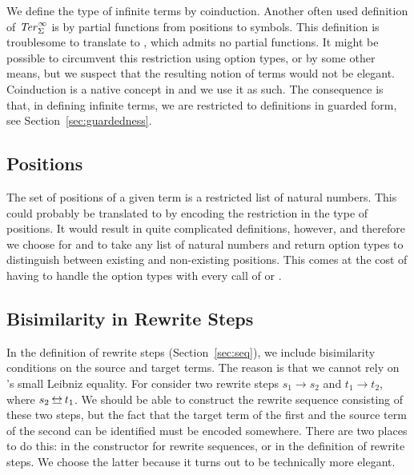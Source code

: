 We define the type of infinite terms by coinduction. Another often
used definition of $\mathit{Ter}_\Sigma^\infty$ is by partial functions from positions to
symbols. This definition is troublesome to translate to \Coq, which
admits no partial functions. It might be possible to circumvent this
restriction using option types, or by some other means, but we suspect
that the resulting notion of terms would not be elegant. Coinduction
is a native concept in \Coq and we use it as such. The consequence is that, in
defining infinite terms, we are restricted to definitions in guarded form, see
Section~\ref{sec:guardedness}.


\subsection{Positions}

The set of positions of a given term is a restricted list of natural
numbers. This could probably be translated to \Coq by encoding the
restriction in the type of positions. It would result in quite
complicated definitions, however, and therefore we choose for
 and
 to take any list of
natural numbers and return option types to distinguish between
existing and non-existing positions. This comes at the cost of having
to handle the option types with every call of
 or
.


\subsection{Bisimilarity in Rewrite Steps}\label{sub:bissteps}

In the definition of rewrite steps (Section~\ref{sec:seq}), we include
bisimilarity conditions on the source and target terms. The reason is
that we cannot rely on \Coq's small Leibniz equality. For consider two
rewrite steps $s_1 \to s_2$ and $t_1 \to t_2$, where $s_2 \bis
t_1$. We should be able to construct the rewrite sequence consisting
of these two steps, but the fact that the target term of the first
and the source term of the second can be identified must be encoded
somewhere. There are two places to do this: in the
 constructor
for rewrite sequences, or in the definition of rewrite steps. We
choose the latter because it turns out to be technically more
elegant.


